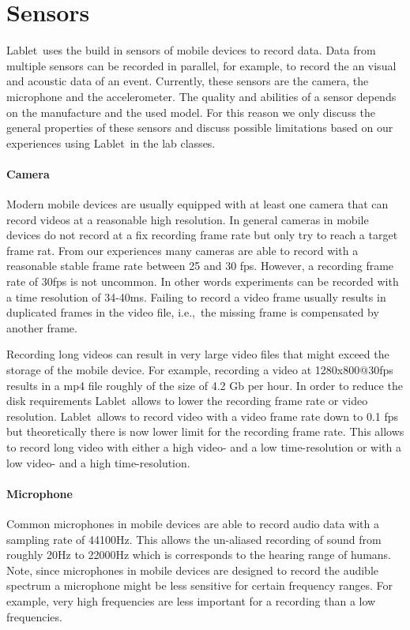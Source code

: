 \documentclass{sigchi}
\newcommand{\ie}{i.e.,\ }
\newcommand{\lablet}{Lablet\ }
\begin{document}
\section{Sensors}
\lablet uses the build in sensors of mobile devices to record data.
Data from multiple sensors can be recorded in parallel, for example, to record the an visual and acoustic data of an event.
Currently, these sensors are the camera, the microphone and the accelerometer.
The quality and abilities of a sensor depends on the manufacture and the used model.
For this reason we only discuss the general properties of these sensors and discuss possible limitations based on our experiences using \lablet in the lab classes.

\paragraph{Camera}
Modern mobile devices are usually equipped with at least one camera that can record videos at a reasonable high resolution.
In general cameras in mobile devices do not record at a fix recording frame rate but only try to reach a target frame rat.
From our experiences many cameras are able to record with a reasonable stable frame rate between 25 and 30 fps.
However, a recording frame rate of 30fps is not uncommon.
In other words experiments can be recorded with a time resolution of 34-40ms.
Failing to record a video frame usually results in duplicated frames in the video file, \ie the missing frame is compensated by another frame.

Recording long videos can result in very large video files that might exceed the storage of the mobile device.
For example, recording a video at 1280x800@30fps results in a mp4 file roughly of the size of 4.2 Gb per hour.
In order to reduce the disk requirements \lablet allows to lower the recording frame rate or video resolution.
\lablet allows to record video with a video frame rate down to 0.1 fps but theoretically there is now lower limit for the recording frame rate.
This allows to record long video with either a high video- and a low time-resolution or with a low video- and a high time-resolution.

\paragraph{Microphone}
Common microphones in mobile devices are able to record audio data with a sampling rate of 44100Hz.
This allows the un-aliased recording of sound from roughly 20Hz to 22000Hz which is corresponds to the hearing range of humans.
Note, since microphones in mobile devices are designed to record the audible spectrum a microphone might be less sensitive for certain frequency ranges.
For example, very high frequencies are less important for a recording than a low frequencies.
\end{document}
